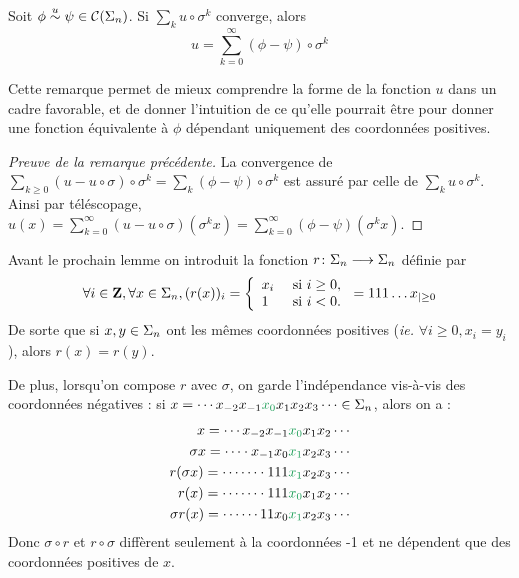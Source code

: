   \begin{remark}
    \label{rm:eq_if_equiv}
    Soit $\phi \overset{u}{\sim} \psi \in \mathcal{C} (\Sigma_{n})$. Si $\sum_k{u\circ\sigma^k}$ converge,
    alors
    $$u = \sum_{k=0}^{\infty}{(\phi - \psi) \circ \sigma^k}$$

    Cette remarque permet de mieux comprendre la forme de la fonction $u$ dans un cadre favorable,
    et de donner l'intuition de ce qu'elle pourrait être pour donner une fonction équivalente à $\phi$ dépendant uniquement des coordonnées positives.
  \end{remark}

  \begin{proof}[Preuve de la remarque précédente]
    La convergence de $\sum_{k \geq 0}{(u - u\circ\sigma)\circ\sigma^k} = \sum_k{(\phi - \psi)\circ\sigma^k}$ est assuré
    par celle de $\sum_k{u\circ\sigma^k}$.
    Ainsi par téléscopage,
    $u(x) = \sum_{k=0}^{\infty}{(u - u \circ \sigma)(\sigma^k x)} = \sum_{k=0}^{\infty}{(\phi - \psi)(\sigma^k x)}$.
  \end{proof}

  Avant le prochain lemme on introduit la fonction $r \colon \Sigma_n \longrightarrow \Sigma_n$ définie par
  $$\forall i \in \mathbf Z, \forall x \in \Sigma_n, (r(x))_i = \left\{
    \begin{array}{ll}
      x_i &\text{ si } i \geq 0, \\
      1   &\text{ si } i < 0.
    \end{array} \right. = 111\hdots x_{|\geq 0}$$
    De sorte que si $x, y \in \Sigma_n$ ont les mêmes coordonnées positives (\textit{ie.} $\forall i \geq 0, x_i = y_i$), alors $r(x) = r(y)$.

    De plus, lorsqu'on compose $r$ avec $\sigma$, on garde l'indépendance vis-à-vis des coordonnées négatives :
    si $x = \cdots x_{-2}x_{-1}\textcolor{ForestGreen}{x_0} x_1 x_2 x_3\cdots \in \s_n$, alors on a :
    \begin{align*}
        x           = \cdots x_{-2}x_{-1}   &\textcolor{ForestGreen}{x_0} x_1 x_2\cdots \\
	\sigma x    = \cdots\cdot x_{-1}x_0 &\textcolor{ForestGreen}{x_1}x_2 x_3\cdots \\
	r(\sigma x) = \cdots\cdots\cdot 111 &\textcolor{ForestGreen}{x_1}x_2x_3\cdots \\
	r(x)	    = \cdots\cdots\cdot 111 &\textcolor{ForestGreen}{x_0}x_1 x_2\cdots \\
	\sigma r(x) = \cdots\cdots 11x_0    &\textcolor{ForestGreen}{x_1}x_2 x_3\cdots
    \end{align*}
    Donc $\sigma \circ r$ et $r \circ \sigma$ diffèrent seulement à la coordonnées -1 et ne dépendent que des coordonnées positives de $x$.

